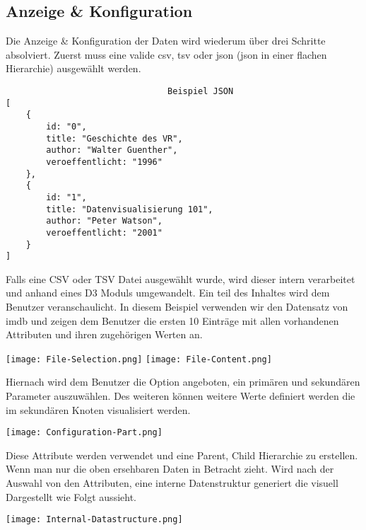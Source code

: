 \subsection{Anzeige \& Konfiguration}
Die Anzeige \& Konfiguration der Daten wird wiederum über drei Schritte absolviert. Zuerst muss eine valide csv, tsv oder json (json in einer
flachen Hierarchie) ausgewählt werden.
\begin{lstlisting}
                                Beispiel JSON
[
    {
        id: "0",
        title: "Geschichte des VR",
        author: "Walter Guenther",
        veroeffentlicht: "1996"
    },
    {
        id: "1",
        title: "Datenvisualisierung 101",
        author: "Peter Watson",
        veroeffentlicht: "2001"
    }
]
\end{lstlisting}
\newpage \noindent
Falls eine CSV oder TSV Datei ausgewählt wurde, wird dieser intern verarbeitet und anhand eines D3 Moduls umgewandelt. Ein teil des Inhaltes wird
dem Benutzer veranschaulicht. In diesem Beispiel verwenden wir den Datensatz von imdb und zeigen dem Benutzer die ersten 10 Einträge mit allen
vorhandenen Attributen und ihren zugehörigen Werten an.
\begin{center}
    \texttt{[image: File-Selection.png]}
    \texttt{[image: File-Content.png]} \\
\end{center}
Hiernach wird dem Benutzer die Option angeboten, ein primären und sekundären Parameter auszuwählen. Des weiteren können weitere Werte definiert
werden die im sekundären Knoten visualisiert werden.
\begin{center}
    \texttt{[image: Configuration-Part.png]} \\
\end{center}
Diese Attribute werden verwendet und eine Parent, Child Hierarchie zu erstellen. 
Wenn man nur die oben ersehbaren Daten in Betracht zieht. Wird nach der Auswahl von den Attributen, eine interne Datenstruktur generiert
die visuell Dargestellt wie Folgt aussieht.
\begin{center}
    \texttt{[image: Internal-Datastructure.png]}\label{setup_data} \\
\end{center}

\newpage
